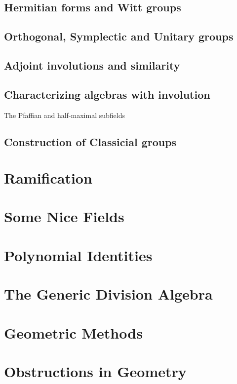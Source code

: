 \documentclass[12pt]{report}
\theoremstyle{plain}
\newcommand{\todo}[1]{\textcolor{todo}{#1}}
\begin{document}
\section{Hermitian forms and Witt groups}

\section{Orthogonal, Symplectic and Unitary groups}

\section{Adjoint involutions and similarity}

\section{Characterizing algebras with involution}

\todo{The Pfaffian and half-maximal subfields}

\section{Construction of Classicial groups}

\chapter{Ramification}

\chapter{Some Nice Fields}

\chapter{Polynomial Identities}

\chapter{The Generic Division Algebra}

\chapter{Geometric Methods}

\chapter{Obstructions in Geometry}
\end{document}
